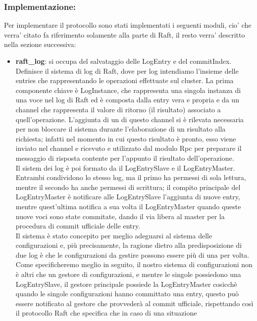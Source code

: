 \subsubsection{Implementazione:\\}
Per implementare il protocollo sono stati implementati i seguenti moduli, cio' che verra' citato
fa riferimento solamente alla parte di Raft, il resto verra' descritto nella sezione successiva:
\begin{itemize}
    \item \textbf{raft\_log}: si occupa del salvataggio delle LogEntry e del commitIndex.
    Definisce il sistema di log di Raft, dove per log intendiamo l'insieme delle entries che rappresentando le operazioni effettuate sul cluster. La prima componente chiave è LogInstance, che 
    rappresenta una singola instanza di una voce nel log di Raft ed è composta dalla entry vera e propria e da un channel che rappresenta il valore di ritorno (il risultato) associato a quell'operazione. L'aggiunta di un 
    di questo channel si è rilevata necessaria per non bloccare il sistema durante l'elaborazione di un risultato alla richiesta; infatti nel momento in cui questo risultato è pronto, esso viene inviato nel channel e ricevuto e 
    utilizzato dal modulo Rpc per preparare il messaggio di risposta contente per l'appunto il risultato dell'operazione. \\
    Il sistem dei log è poi formato da il LogEntrySlave e il LogEntryMaster. Entrambi condividono lo stesso log, ma il primo ha permessi di sola lettura, mentre il secondo ha anche permessi di scrittura; il compito principale 
    del LogEntryMaster è notificare alle LogEntrySlave l'aggiunta di nuove entry, mentre quest'ultima notifica a sua volta il LogEntryMaster quando queste nuove voci sono state commitate, dando il via libera al master per la 
    procedura di commit ufficiale delle entry. \\
    Il sistema è stato concepito per meglio adeguarsi al sistema delle configurazioni e, più precisamente, la ragione dietro alla predisposizione di due log è che le configurazioni da gestire possono essere più di una per volta. 
    Come specificheremo meglio in seguito, il nostro sistema di configurazioni non è altri che un gestore di configurazioni, e mentre le singole possiedono una LogEntrySlave, il gestore principale possiede la LogEntryMaster 
    cosicchè quando le singole configurazioni hanno committato una entry, questo può essere notificato al gestore che provvederà al commit ufficiale, rispettando così il protocollo Raft che specifica che in caso di una situazione

\end{itemize}
